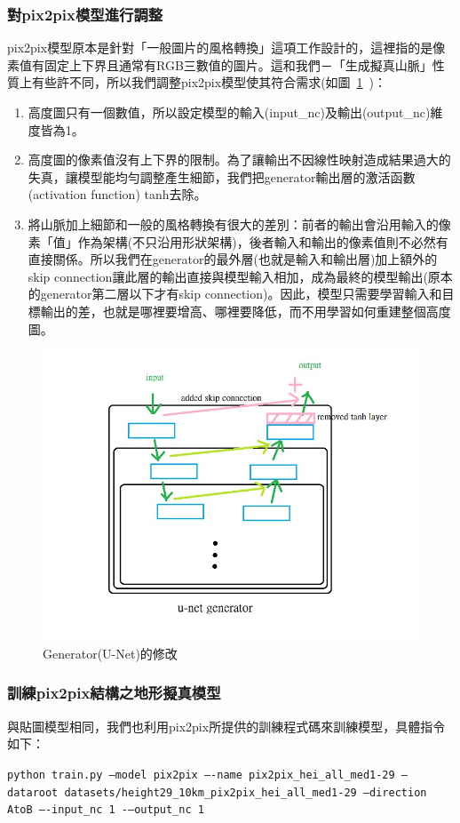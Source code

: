 \documentclass[a4paper, 12pt]{article}
\begin{document}
\subsubsection{對pix2pix模型進行調整}
pix2pix模型原本是針對「一般圖片的風格轉換」這項工作設計的，這裡指的是像素值有固定上下界且通常有RGB三數值的圖片。這和我們－「生成擬真山脈」性質上有些許不同，所以我們調整pix2pix模型使其符合需求(如圖~\ref{fig:13}~)：
\begin{enumerate}
    \item 高度圖只有一個數值，所以設定模型的輸入(input\_nc)及輸出(output\_nc)維度皆為1。
    \item 高度圖的像素值沒有上下界的限制。為了讓輸出不因線性映射造成結果過大的失真，讓模型能均勻調整產生細節，我們把generator輸出層的激活函數(activation function) tanh去除。
    \item 將山脈加上細節和一般的風格轉換有很大的差別：前者的輸出會沿用輸入的像素「值」作為架構(不只沿用形狀架構)，後者輸入和輸出的像素值則不必然有直接關係。所以我們在generator的最外層(也就是輸入和輸出層)加上額外的skip connection讓此層的輸出直接與模型輸入相加，成為最終的模型輸出(原本的generator第二層以下才有skip connection)。因此，模型只需要學習輸入和目標輸出的差，也就是哪裡要增高、哪裡要降低，而不用學習如何重建整個高度圖。
\end{enumerate}
\begin{figure}[htbp]
    \centering
    \includegraphics[width=0.6\linewidth]{fig/13.jpg}
    \caption{Generator(U-Net)的修改}
    \label{fig:13}
\end{figure}
\subsubsection{訓練pix2pix結構之地形擬真模型}
與貼圖模型相同，我們也利用pix2pix所提供的訓練程式碼來訓練模型，具體指令如下：
\begin{center}
    \texttt{\small python train.py --model pix2pix –-name pix2pix\_hei\_all\_med1-29 --dataroot datasets/height29\_10km\_pix2pix\_hei\_all\_med1-29 --direction AtoB –-input\_nc 1 -–output\_nc 1}
\end{center}
\end{document}
